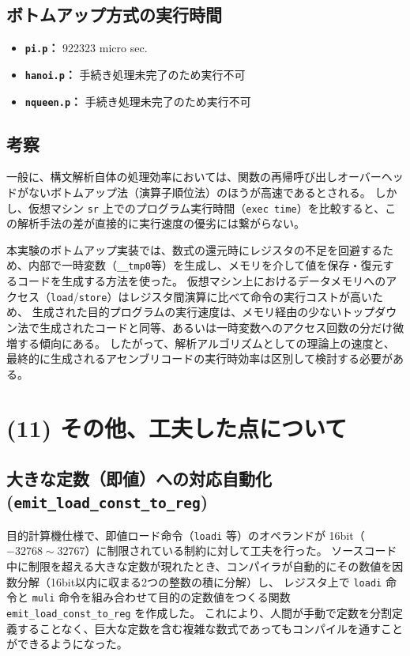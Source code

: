 \documentclass[11pt,a4paper,dvipdfmx]{bxjsarticle}
\begin{document}
\subsection*{ボトムアップ方式の実行時間}
\begin{itemize}
    \item \textbf{\texttt{pi.p}：} 922323 micro sec.
    \item \textbf{\texttt{hanoi.p}：} 手続き処理未完了のため実行不可
    \item \textbf{\texttt{nqueen.p}：} 手続き処理未完了のため実行不可
\end{itemize}

\subsection*{考察}
一般に、構文解析自体の処理効率においては、関数の再帰呼び出しオーバーヘッドがないボトムアップ法（演算子順位法）のほうが高速であるとされる。
しかし、仮想マシン \texttt{sr} 上でのプログラム実行時間（\texttt{exec time}）を比較すると、この解析手法の差が直接的に実行速度の優劣には繋がらない。

本実験のボトムアップ実装では、数式の還元時にレジスタの不足を回避するため、内部で一時変数（\texttt{\_\_tmp0}等）を生成し、メモリを介して値を保存・復元するコードを生成する方法を使った。
仮想マシン上におけるデータメモリへのアクセス（\texttt{load}/\texttt{store}）はレジスタ間演算に比べて命令の実行コストが高いため、
生成された目的プログラムの実行速度は、メモリ経由の少ないトップダウン法で生成されたコードと同等、あるいは一時変数へのアクセス回数の分だけ微増する傾向にある。
したがって、解析アルゴリズムとしての理論上の速度と、最終的に生成されるアセンブリコードの実行時効率は区別して検討する必要がある。

\section*{(11) その他、工夫した点について}
\subsection*{大きな定数（即値）への対応自動化 (\texttt{emit\_load\_const\_to\_reg})}
目的計算機仕様で、即値ロード命令（\texttt{loadi} 等）のオペランドが 16bit（$-32768 \sim 32767$）に制限されている制約に対して工夫を行った。
ソースコード中に制限を超える大きな定数が現れたとき、コンパイラが自動的にその数値を因数分解（16bit以内に収まる2つの整数の積に分解）し、
レジスタ上で \texttt{loadi} 命令と \texttt{muli} 命令を組み合わせて目的の定数値をつくる関数 \texttt{emit\_load\_const\_to\_reg} を作成した。
これにより、人間が手動で定数を分割定義することなく、巨大な定数を含む複雑な数式であってもコンパイルを通すことができるようになった。
\end{document}

